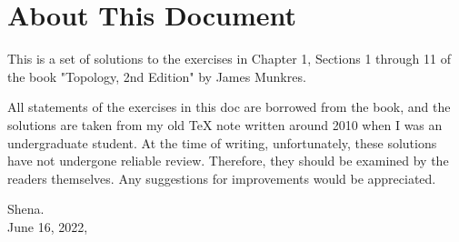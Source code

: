 \documentclass[a4paper,12pt]{article}
\begin{document}
\section*{About This Document}
This is a set of solutions to the exercises in Chapter 1, Sections 1 through 11 of the book "Topology, 2nd Edition" by James Munkres.

All statements of the exercises in this doc are borrowed from the book, and the solutions are taken from my old TeX note written around 2010 when I was an undergraduate student. At the time of writing, unfortunately, these solutions have not undergone reliable review. Therefore, they should be examined by the readers themselves. Any suggestions for improvements would be appreciated.

\begin{flushright}
	Shena.\\
	June 16, 2022,
\end{flushright}
\end{document}
